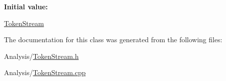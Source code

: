 {\bfseries Initial value\+:}
\begin{DoxyCode}
\DoxyCodeLine{=}
\end{DoxyCode}
\mbox{\hyperlink{classlucene_1_1core_1_1analysis_1_1TokenStream}{Token\+Stream}} 

The documentation for this class was generated from the following files\+:\begin{DoxyCompactItemize}
\item 
Analysis/\mbox{\hyperlink{TokenStream_8h}{Token\+Stream.\+h}}\item 
Analysis/\mbox{\hyperlink{TokenStream_8cpp}{Token\+Stream.\+cpp}}\end{DoxyCompactItemize}

